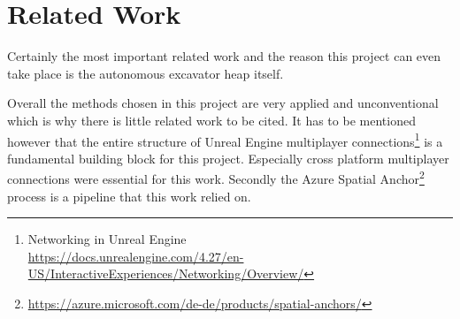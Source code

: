 \chapter{Related Work}\label{ch:related_work}

Certainly the most important related work and the reason this project can even take place is the autonomous excavator heap\citep*{heap} itself. 

Overall the methods chosen in this project are very applied and unconventional which is why there is little related work to be cited. It has to be mentioned however that the entire structure of Unreal Engine multiplayer connections\footnote{Networking in Unreal Engine\\ \url{https://docs.unrealengine.com/4.27/en-US/InteractiveExperiences/Networking/Overview/}} is a fundamental building block for this project. Especially cross platform multiplayer connections were essential for this work. Secondly the Azure Spatial Anchor\footnote{\url{https://azure.microsoft.com/de-de/products/spatial-anchors/}} process is a pipeline that this work relied on.